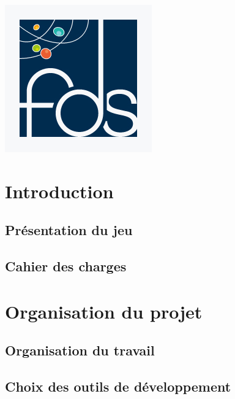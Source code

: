 \documentclass[12pt]{report}
\begin{document}
\begin{titlepage}
\begin{center}
			\vfill
				
			\includegraphics[scale=0.3]{logo-fds.jpg}~
				
				
				
		\end{center}
	\end{titlepage}
	
\tableofcontents

\chapter*{Introduction}
    
    \section*{Présentation du jeu}
    
    \section*{Cahier des charges}
    
\chapter{Organisation du projet}

    \section{Organisation du travail}
    
    \section{Choix des outils de développement}
    
\end{document}
